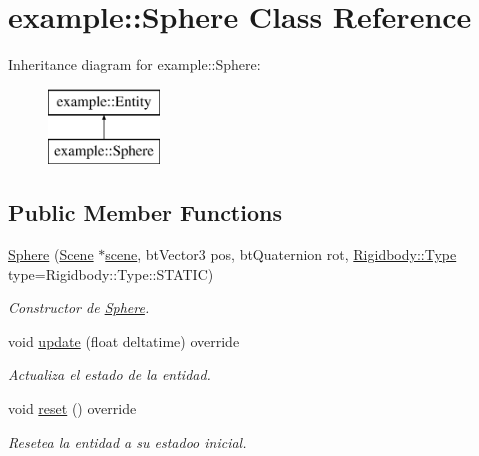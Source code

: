 \hypertarget{classexample_1_1_sphere}{}\section{example\+::Sphere Class Reference}
\label{classexample_1_1_sphere}
Inheritance diagram for example\+::Sphere\+:\begin{figure}[H]
\begin{center}
\leavevmode
\includegraphics[height=2.000000cm]{classexample_1_1_sphere}
\end{center}
\end{figure}
\subsection*{Public Member Functions}
\begin{DoxyCompactItemize}
\item 
\mbox{\hyperlink{classexample_1_1_sphere_a16906267736e3e1b83e3982a4a3fa92d}{Sphere}} (\mbox{\hyperlink{classexample_1_1_scene}{Scene}} $\ast$\mbox{\hyperlink{classexample_1_1_entity_ab851dbde4a16829f9fb77ab9a66b9f1e}{scene}}, bt\+Vector3 pos, bt\+Quaternion rot, \mbox{\hyperlink{classexample_1_1_rigidbody_a527ee68e1748a5a6014b7fcbe9f86e3d}{Rigidbody\+::\+Type}} type=Rigidbody\+::\+Type\+::\+S\+T\+A\+T\+IC)
\begin{DoxyCompactList}\small\item\em Constructor de \mbox{\hyperlink{classexample_1_1_sphere}{Sphere}}. \end{DoxyCompactList}\item 
void \mbox{\hyperlink{classexample_1_1_sphere_a68d6efb4ed4119ddd93570ca689b3d23}{update}} (float deltatime) override
\begin{DoxyCompactList}\small\item\em Actualiza el estado de la entidad. \end{DoxyCompactList}\item 
void \mbox{\hyperlink{classexample_1_1_sphere_ae76b4b7d9d5a4f14fe0308bf576a5a62}{reset}} () override
\begin{DoxyCompactList}\small\item\em Resetea la entidad a su estadoo inicial. \end{DoxyCompactList}\end{DoxyCompactItemize}
